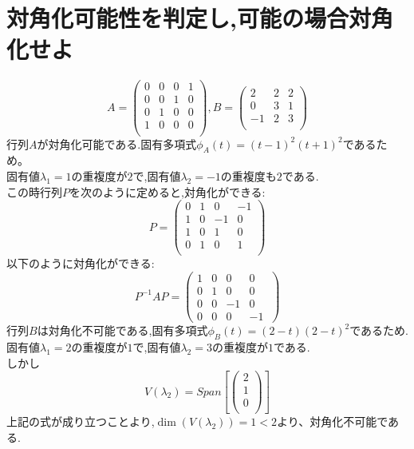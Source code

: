 \documentclass{jreport}
\begin{document}
\section{対角化可能性を判定し,可能の場合対角化せよ}
$$
A=
\left(
\begin{array}{cccc}
	0 & 0 & 0 & 1\\
	0 & 0 & 1 & 0\\
	0 & 1 & 0 & 0\\
	1 & 0 & 0 & 0\\
\end{array}
\right)
,
B=
\left(
\begin{array}{ccc}
        2 & 2 & 2\\
        0 & 3 & 1\\
       -1 & 2 & 3\\
\end{array}
\right)
$$
行列$A$が対角化可能である.固有多項式$\phi_A(t) =(t-1)^2(t+1)^2$であるため。\\
固有値$\lambda_1 =1$の重複度が$2$で,固有値$\lambda_2 =-1$の重複度も$2$である.\\
この時行列$P$を次のように定めると,対角化ができる:
$$
P=
\left(
\begin{array}{cccc}
        0 & 1 & 0 &-1\\
        1 & 0 &-1 & 0\\
        1 & 0 & 1 & 0\\
        0 & 1 & 0 & 1\\
\end{array}
\right)
$$
以下のように対角化ができる:
$$
P^{-1}AP=
\left(
\begin{array}{cccc}
        1 & 0 & 0 & 0\\
        0 & 1 & 0 & 0\\
        0 & 0 &-1 & 0\\
        0 & 0 & 0 & -1\
\end{array}
\right)
$$
行列$B$は対角化不可能である,固有多項式$\phi_B(t) =(2-t)(2-t)^2$であるため.\\
固有値$\lambda_1 =2$の重複度が$1$で,固有値$\lambda_2 =3$の重複度が$1$である.\\
しかし
$$
V(\lambda_2) = Span[\left(
                        \begin{array}{c}
                                2\\
                                1\\
                                0\\
                        \end{array}
                        \right)
                        ]
$$
上記の式が成り立つことより,$\dim(V(\lambda_2)) =1 <2$より、対角化不可能である.
\end{document}
